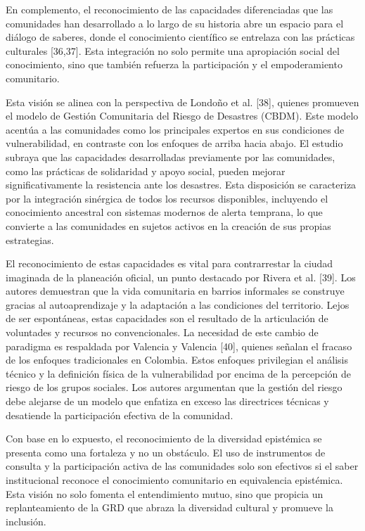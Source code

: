 \documentclass[
  spanish,
  letterpaper,
]{book}
\begin{document}
En complemento, el reconocimiento de las capacidades diferenciadas que
las comunidades han desarrollado a lo largo de su historia abre un
espacio para el diálogo de saberes, donde el conocimiento científico se
entrelaza con las prácticas culturales {[}36,37{]}. Esta integración no
solo permite una apropiación social del conocimiento, sino que también
refuerza la participación y el empoderamiento comunitario.

Esta visión se alinea con la perspectiva de Londoño et al. {[}38{]},
quienes promueven el modelo de Gestión Comunitaria del Riesgo de
Desastres (CBDM). Este modelo acentúa a las comunidades como los
principales expertos en sus condiciones de vulnerabilidad, en contraste
con los enfoques de arriba hacia abajo. El estudio subraya que las
capacidades desarrolladas previamente por las comunidades, como las
prácticas de solidaridad y apoyo social, pueden mejorar
significativamente la resistencia ante los desastres. Esta disposición
se caracteriza por la integración sinérgica de todos los recursos
disponibles, incluyendo el conocimiento ancestral con sistemas modernos
de alerta temprana, lo que convierte a las comunidades en sujetos
activos en la creación de sus propias estrategias.

El reconocimiento de estas capacidades es vital para contrarrestar la
ciudad imaginada de la planeación oficial, un punto destacado por Rivera
et al. {[}39{]}. Los autores demuestran que la vida comunitaria en
barrios informales se construye gracias al autoaprendizaje y la
adaptación a las condiciones del territorio. Lejos de ser espontáneas,
estas capacidades son el resultado de la articulación de voluntades y
recursos no convencionales. La necesidad de este cambio de paradigma es
respaldada por Valencia y Valencia {[}40{]}, quienes señalan el fracaso
de los enfoques tradicionales en Colombia. Estos enfoques privilegian el
análisis técnico y la definición física de la vulnerabilidad por encima
de la percepción de riesgo de los grupos sociales. Los autores
argumentan que la gestión del riesgo debe alejarse de un modelo que
enfatiza en exceso las directrices técnicas y desatiende la
participación efectiva de la comunidad.

Con base en lo expuesto, el reconocimiento de la diversidad epistémica
se presenta como una fortaleza y no un obstáculo. El uso de instrumentos
de consulta y la participación activa de las comunidades solo son
efectivos si el saber institucional reconoce el conocimiento comunitario
en equivalencia epistémica. Esta visión no solo fomenta el entendimiento
mutuo, sino que propicia un replanteamiento de la GRD que abraza la
diversidad cultural y promueve la inclusión.
\end{document}
